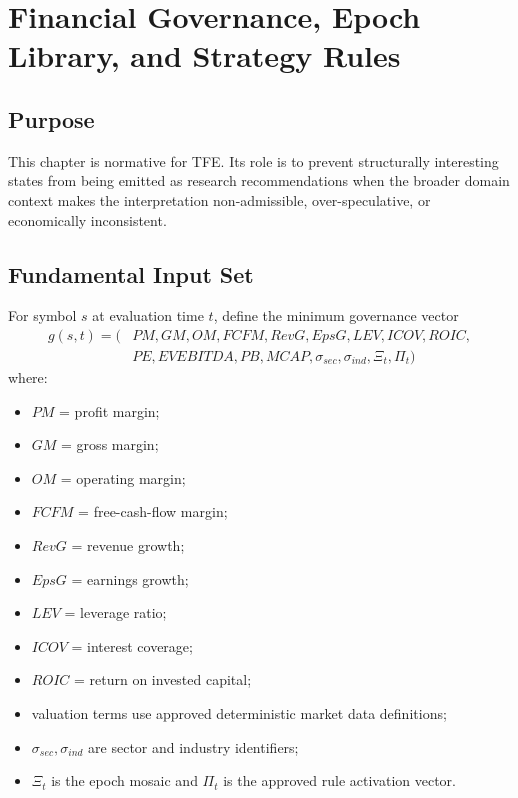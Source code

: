 \chapter{Financial Governance, Epoch Library, and Strategy Rules}
\section{Purpose}

This chapter is normative for TFE. Its role is to prevent structurally interesting states from being emitted as research recommendations when the broader domain context makes the interpretation non-admissible, over-speculative, or economically inconsistent.

\section{Fundamental Input Set}

For symbol $s$ at evaluation time $t$, define the minimum governance vector
\begin{align*}
g(s,t)=(&PM,GM,OM,FCFM,RevG,EpsG,LEV,ICOV,ROIC,\\
&PE,EVEBITDA,PB,MCAP,\sigma_{sec},\sigma_{ind},\Xi_t,\Pi_t)
\end{align*}
where:
\begin{itemize}
\item $PM$ = profit margin;
\item $GM$ = gross margin;
\item $OM$ = operating margin;
\item $FCFM$ = free-cash-flow margin;
\item $RevG$ = revenue growth;
\item $EpsG$ = earnings growth;
\item $LEV$ = leverage ratio;
\item $ICOV$ = interest coverage;
\item $ROIC$ = return on invested capital;
\item valuation terms use approved deterministic market data definitions;
\item $\sigma_{sec},\sigma_{ind}$ are sector and industry identifiers;
\item $\Xi_t$ is the epoch mosaic and $\Pi_t$ is the approved rule activation vector.
\end{itemize}

